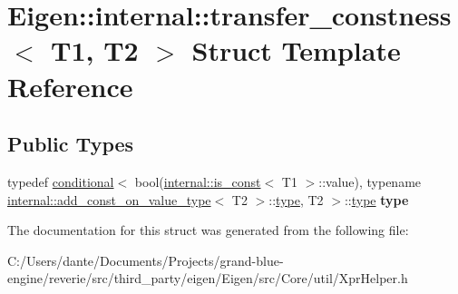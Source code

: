 \hypertarget{struct_eigen_1_1internal_1_1transfer__constness}{}\section{Eigen\+::internal\+::transfer\+\_\+constness$<$ T1, T2 $>$ Struct Template Reference}
\label{struct_eigen_1_1internal_1_1transfer__constness}
\subsection*{Public Types}
\begin{DoxyCompactItemize}
\item 
\mbox{\label{struct_eigen_1_1internal_1_1transfer__constness_a0eeedf663ff71e7a42e3ea726927afc0}} 
typedef \mbox{\hyperlink{struct_eigen_1_1internal_1_1conditional}{conditional}}$<$ bool(\mbox{\hyperlink{struct_eigen_1_1internal_1_1is__const}{internal\+::is\+\_\+const}}$<$ T1 $>$\+::value), typename \mbox{\hyperlink{struct_eigen_1_1internal_1_1add__const__on__value__type}{internal\+::add\+\_\+const\+\_\+on\+\_\+value\+\_\+type}}$<$ T2 $>$\+::\mbox{\hyperlink{struct_eigen_1_1internal_1_1true__type}{type}}, T2 $>$\+::\mbox{\hyperlink{struct_eigen_1_1internal_1_1true__type}{type}} {\bfseries type}
\end{DoxyCompactItemize}


The documentation for this struct was generated from the following file\+:\begin{DoxyCompactItemize}
\item 
C\+:/\+Users/dante/\+Documents/\+Projects/grand-\/blue-\/engine/reverie/src/third\+\_\+party/eigen/\+Eigen/src/\+Core/util/Xpr\+Helper.\+h\end{DoxyCompactItemize}
